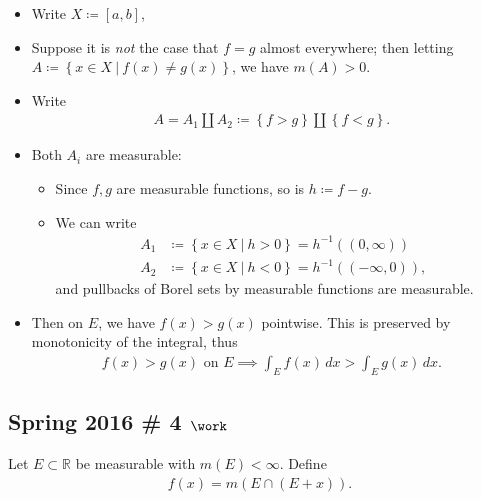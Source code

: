 \begin{solution}

\envlist

\begin{itemize}
\tightlist
\item
  Write \(X\coloneqq[a, b]\),
\item
  Suppose it is \emph{not} the case that \(f=g\) almost everywhere; then
  letting
  \(A\coloneqq\left\{{x\in X {~\mathrel{\Big|}~}f(x) \neq g(x)}\right\}\),
  we have \(m(A) > 0\).
\item
  Write
  \begin{align*}
  A = A_1 {\textstyle\coprod}A_2 \coloneqq\left\{{f > g}\right\} {\textstyle\coprod}\left\{{f < g}\right\}
  .\end{align*}
\item
  Both \(A_i\) are measurable:

  \begin{itemize}
  \tightlist
  \item
    Since \(f,g\) are measurable functions, so is \(h\coloneqq f-g\).
  \item
    We can write
    \begin{align*}
    A_1 &\coloneqq\left\{{ x\in X {~\mathrel{\Big|}~}h > 0 }\right\} = h^{-1}((0, \infty)) \\
    A_2 &\coloneqq\left\{{ x\in X {~\mathrel{\Big|}~}h < 0 }\right\} = h^{-1}((-\infty, 0))
    ,\end{align*}
    and pullbacks of Borel sets by measurable functions are measurable.
  \end{itemize}
\item
  Then on \(E\), we have \(f(x)>g(x)\) pointwise. This is preserved by
  monotonicity of the integral, thus
  \begin{align*}  
  f(x) > g(x) \text{ on } E \implies \int_{E} f(x)\,dx > \int_{E} g(x)\, dx 
  .\end{align*}
\end{itemize}

\end{solution}

\hypertarget{spring-2016-4-work}{%
\subsection{\texorpdfstring{Spring 2016 \# 4
\(\work\)}{Spring 2016 \# 4 \textbackslash work}}\label{spring-2016-4-work}}

Let \(E \subset {\mathbb{R}}\) be measurable with \(m(E) < \infty\).
Define
\begin{align*}
f(x)=m(E \cap(E+x)).
\end{align*}

